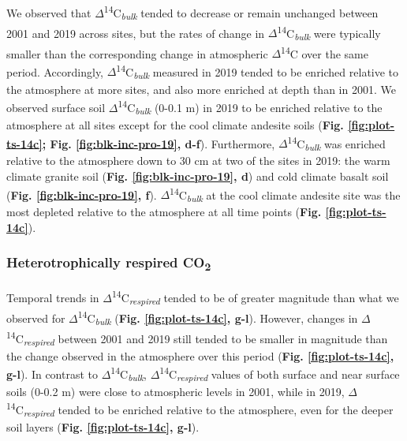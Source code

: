 \documentclass[english,man,floatsintext]{apa6}
\begin{document}
We observed that \(\Delta\)\textsuperscript{14}C\textsubscript{\emph{bulk}} tended to decrease or remain unchanged between 2001 and 2019 across sites, but the rates of change in \(\Delta\)\textsuperscript{14}C\textsubscript{\emph{bulk}} were typically smaller than the corresponding change in atmospheric \(\Delta\)\textsuperscript{14}C over the same period. Accordingly, \(\Delta\)\textsuperscript{14}C\textsubscript{\emph{bulk}} measured in 2019 tended to be enriched relative to the atmosphere at more sites, and also more enriched at depth than in 2001. We observed surface soil \(\Delta\)\textsuperscript{14}C\textsubscript{\emph{bulk}} (0-0.1 m) in 2019 to be enriched relative to the atmosphere at all sites except for the cool climate andesite soils (\textbf{Fig. \ref{fig:plot-ts-14c}; Fig. \ref{fig:blk-inc-pro-19}, d-f}). Furthermore, \(\Delta\)\textsuperscript{14}C\textsubscript{\emph{bulk}} was enriched relative to the atmosphere down to 30 cm at two of the sites in 2019: the warm climate granite soil (\textbf{Fig. \ref{fig:blk-inc-pro-19}, d}) and cold climate basalt soil (\textbf{Fig. \ref{fig:blk-inc-pro-19}, f}). \(\Delta\)\textsuperscript{14}C\textsubscript{\emph{bulk}} at the cool climate andesite site was the most depleted relative to the atmosphere at all time points (\textbf{Fig. \ref{fig:plot-ts-14c}}).

\hypertarget{heterotrophically-respired-co2-1}{%
\subsubsection{\texorpdfstring{Heterotrophically respired CO\textsubscript{2}}{Heterotrophically respired CO2}}\label{heterotrophically-respired-co2-1}}

Temporal trends in \(\Delta\)\textsuperscript{14}C\textsubscript{\emph{respired}} tended to be of greater magnitude than what we observed for \(\Delta\)\textsuperscript{14}C\textsubscript{\emph{bulk}} (\textbf{Fig. \ref{fig:plot-ts-14c}, g-l}). However, changes in \(\Delta\)\textsuperscript{14}C\textsubscript{\emph{respired}} between 2001 and 2019 still tended to be smaller in magnitude than the change observed in the atmosphere over this period (\textbf{Fig. \ref{fig:plot-ts-14c}, g-l}). In contrast to \(\Delta\)\textsuperscript{14}C\textsubscript{\emph{bulk}}, \(\Delta\)\textsuperscript{14}C\textsubscript{\emph{respired}} values of both surface and near surface soils (0-0.2 m) were close to atmospheric levels in 2001, while in 2019, \(\Delta\)\textsuperscript{14}C\textsubscript{\emph{respired}} tended to be enriched relative to the atmosphere, even for the deeper soil layers (\textbf{Fig. \ref{fig:plot-ts-14c}, g-l}).
\end{document}

